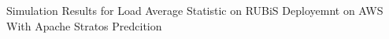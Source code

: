 Simulation Results for Load Average Statistic on RUBiS Deployemnt on AWS With Apache Stratos Predcition